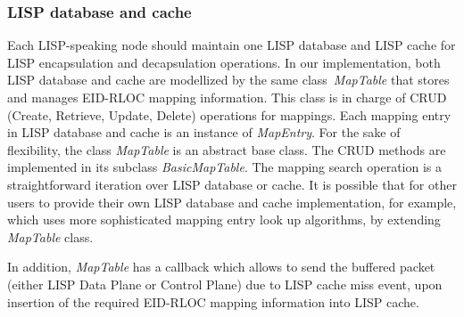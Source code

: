 \subsubsection{LISP database and cache}
\label{subsec:database-impl}
Each LISP-speaking node should maintain one LISP database and LISP cache for LISP encapsulation and decapsulation operations. In our implementation, both LISP database and cache are modellized by the same class~\emph{MapTable} that stores and manages EID-RLOC mapping information. This class is in charge of CRUD (Create, Retrieve, Update, Delete) operations for mappings. Each mapping entry in LISP database and cache is an instance of \emph{MapEntry}. For the sake of flexibility, the class \emph{MapTable} is an abstract base class. The CRUD methods are implemented in its subclass \emph{BasicMapTable}. The mapping search operation is a straightforward iteration over LISP database or cache. It is possible that for other users to provide their own LISP database and cache implementation, for example, which uses more sophisticated mapping entry look up algorithms, by extending \emph{MapTable} class.

In addition, \emph{MapTable} has a callback which allows to send the buffered packet (either LISP Data Plane or Control Plane) %
due to LISP cache miss event, upon insertion of the required EID-RLOC mapping information into LISP cache.

